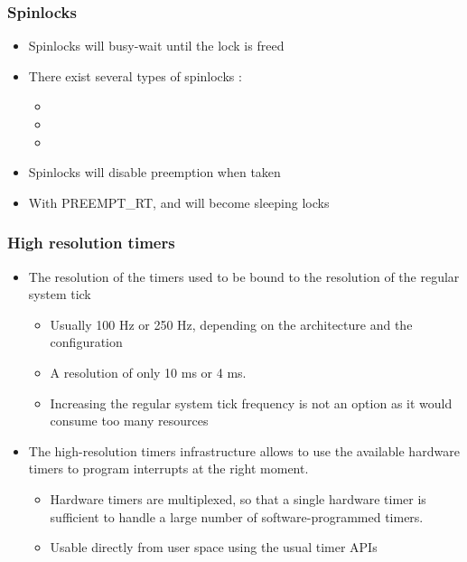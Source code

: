 \begin{frame}
  \frametitle{Spinlocks}
	\begin{itemize}
		\item Spinlocks will busy-wait until the lock is freed
		\item There exist several types of spinlocks :
		\begin{itemize}
			\item {}
			\item {}
			\item {}
		\end{itemize}
		\item Spinlocks will disable preemption when taken
		\item With PREEMPT\_RT,  and  will become sleeping locks
	\end{itemize}
\end{frame}

\begin{frame}
  \frametitle{High resolution timers}
  \begin{itemize}
  \item The resolution of the timers used to be bound to the
    resolution of the regular system tick
    \begin{itemize}
    \item Usually 100 Hz or 250 Hz, depending on the architecture and
      the configuration
    \item A resolution of only 10 ms or 4 ms.
    \item Increasing the regular system tick frequency is not an
      option as it would consume too many resources
    \end{itemize}
  \item The high-resolution timers infrastructure allows to use
    the available hardware timers to program interrupts
    at the right moment.
    \begin{itemize}
    \item Hardware timers are multiplexed, so that a single hardware
      timer is sufficient to handle a large number of
      software-programmed timers.
    \item Usable directly from user space using the usual timer APIs
    \end{itemize}
  \end{itemize}
\end{frame}

